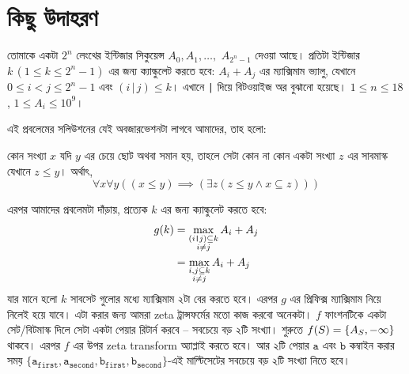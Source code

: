 \section{কিছু উদাহরণ}

\begin{example}
  তোমাকে একটা $2^n$ লেংথের ইন্টিজার সিকুয়েন্স $A_0, A_1, \ldots,$ $A_{2^n-1}$
  দেওয়া আছে। প্রতিটা ইন্টিজার $k \, (1 \le k \le 2^n-1)$ এর জন্য ক্যাল্কুলেট
  করতে হবে: $A_i + A_j$ এর ম্যাক্সিমাম ভ্যালু, যেখানে $0 \le i < j \le 2^n-1$
  এবং $(i \, \texttt{|} \, j) \le k$। এখানে \texttt{|} দিয়ে বিটওয়াইজ অর
  বুঝানো হয়েছে। $1 \le n \le 18$, $1 \le A_i \le 10^9$।
\end{example}
\begin{solution}
  এই প্রবলেমের সলিউশনের যেই অবজারভেশনটা লাগবে আমাদের, তাহ হলো:
  \begin{observation}
    কোন সংখ্যা $x$ যদি $y$ এর চেয়ে ছোট অথবা সমান হয়, তাহলে সেটা কোন না কোন
    একটা সংখ্যা $z$ এর সাবমাস্ক যেখানে $z \le y$। অর্থাৎ,
    \[
      \forall x \forall y ((x \le y) \implies (\exists z (z \le y \land x
      \subseteq z)))
    \]
  \end{observation}
  এরপর আমাদের প্রবলেমটা দাঁড়ায়, প্রত্যেক $k$ এর জন্য ক্যাল্কুলেট করতে হবে:
  \begin{align*}
    g(k) &= \max_{\substack{(i\texttt{|}j) \subseteq k\\i \ne j}} A_i +
    A_j\\
    &= \max_{\substack{i, j \subseteq k\\i \ne j}} A_i +
    A_j
  \end{align*}
  যার মানে হলো $k$ সাবসেট গুলোর মধ্যে ম্যাক্সিমাম ২টা বের করতে হবে। এরপর $g$
  এর প্রিফিক্স ম্যাক্সিমাম নিয়ে নিলেই হয়ে যাবে। এটা করার জন্য আমরা zeta
  ট্রান্সফর্মের মতো কাজ করবো অনেকটা। $f$ ফাংশনটিকে একটা সেট/বিটমাস্ক দিলে
  সেটা একটা পেয়ার রিটার্ন করবে -- সবচেয়ে বড় ২টি সংখ্যা। শুরুতে $f(S) =
  \{A_S, -\infty\}$ থাকবে। এরপর $f$ এর উপর zeta transform অ্যাপ্লাই করতে হবে।
  আর ২টি পেয়ার $\texttt{a}$ এবং $\texttt{b}$ কম্বাইন করার সময়
  $\{\mathtt{a_{first}}, \mathtt{a_{second}}, \mathtt{b_{first}},
  \mathtt{b_{second}}\}$-এই মাল্টিসেটের সবচেয়ে বড় ২টি সংখ্যা নিতে হবে।
\end{solution}
